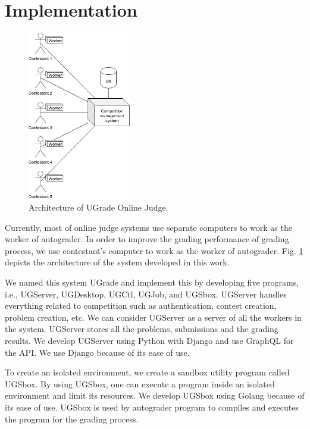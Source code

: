 \documentclass[conference,a4paper]{IEEEtran}
\begin{document}
\section{Implementation}

\begin{figure}[htbp]
\centerline{\includegraphics[width=0.4\textwidth]{images/paper-architecture-new.jpeg}}
\caption{Architecture of UGrade Online Judge.}
\label{architecture-new}
\end{figure}

Currently, most of online judge systems use separate computers to work as the worker of autograder. In order to improve the grading performance of grading process, we use contestant's computer to work as the worker of autograder. Fig. \ref{architecture-new} depicts the architecture of the system developed in this work. 

We named this system UGrade and implement this by developing five programs, i.e., UGServer, UGDesktop, UGCtl, UGJob, and UGSbox. UGServer handles everything related to competition such as authentication, contest creation, problem creation, etc. We can consider UGServer as a server of all the workers in the system. UGServer stores all the problems, submissions and the grading results. We develop UGServer using Python with Django and use GraphQL for the API. We use Django because of its ease of use.

To create an isolated environment, we create a sandbox utility program called UGSbox. By using UGSbox, one can execute a program inside an isolated environment and limit its resources. We develop UGSbox using Golang because of its ease of use. UGSbox is used by autograder program to compiles and executes the program for the grading process.
\end{document}
